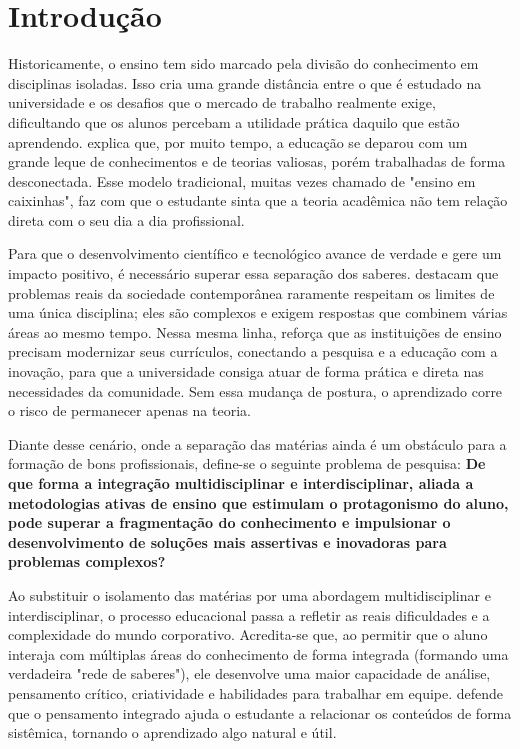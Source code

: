 \chapter{Introdução}
\label{cap:introducao}

Historicamente, o ensino tem sido marcado pela divisão do conhecimento em
disciplinas isoladas. Isso cria uma grande distância entre o que é estudado na
universidade e os desafios que o mercado de trabalho realmente exige,
dificultando que os alunos percebam a utilidade prática daquilo que estão
aprendendo.  explica que, por muito tempo, a educação se deparou
com um grande leque de conhecimentos e de teorias valiosas, porém trabalhadas
de forma desconectada. Esse modelo tradicional, muitas vezes chamado de "ensino
em caixinhas", faz com que o estudante sinta que a teoria acadêmica não tem
relação direta com o seu dia a dia profissional.

Para que o desenvolvimento científico e tecnológico avance de verdade e gere um
impacto positivo, é necessário superar essa separação dos saberes. 
destacam que problemas reais da sociedade contemporânea raramente
respeitam os limites de uma única disciplina; eles são complexos e exigem
respostas que combinem várias áreas ao mesmo tempo. Nessa mesma linha,
 reforça que as instituições de ensino precisam modernizar seus
currículos, conectando a pesquisa e a educação com a inovação, para que a
universidade consiga atuar de forma prática e direta nas necessidades da
comunidade. Sem essa mudança de postura, o aprendizado corre o risco de
permanecer apenas na teoria.

Diante desse cenário, onde a separação das matérias ainda é um obstáculo para a
formação de bons profissionais, define-se o seguinte problema de pesquisa:
\textbf{De que forma a integração multidisciplinar e interdisciplinar, aliada a
    metodologias ativas de ensino que estimulam o protagonismo do aluno, pode
    superar a fragmentação do conhecimento e impulsionar o desenvolvimento de
    soluções mais assertivas e inovadoras para problemas complexos?}

Ao substituir o isolamento das matérias por uma abordagem multidisciplinar e
interdisciplinar, o processo educacional passa a refletir as reais dificuldades
e a complexidade do mundo corporativo. Acredita-se que, ao permitir que o aluno
interaja com múltiplas áreas do conhecimento de forma integrada (formando uma
verdadeira "rede de saberes"), ele desenvolve uma maior capacidade de análise,
pensamento crítico, criatividade e habilidades para trabalhar em equipe.
 defende que o pensamento integrado ajuda o estudante a
relacionar os conteúdos de forma sistêmica, tornando o aprendizado algo natural
e útil.

